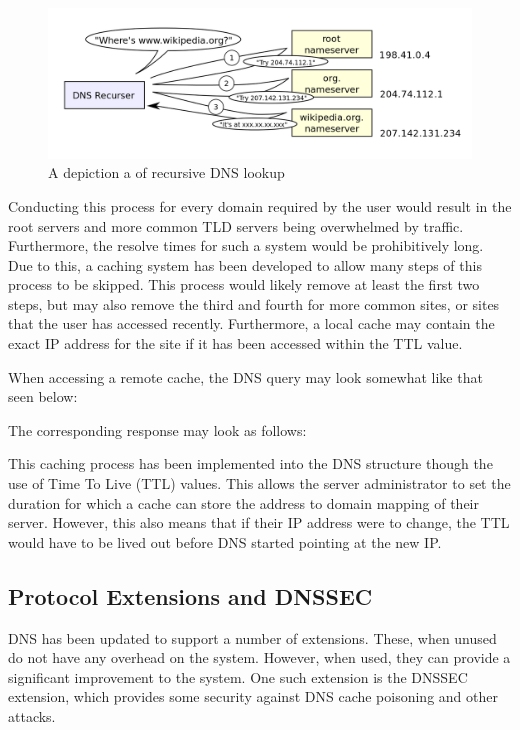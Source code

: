 			\begin{figure}[htb]
				\centering
					\includegraphics[scale=0.27]{./DNSRecursor.png}
					\caption{A depiction a of recursive DNS lookup}
					\label{fig:DNSRecursor}
			\end{figure}

			Conducting this process for every domain required by the user would result in the root servers and more common TLD servers being overwhelmed by traffic.
			Furthermore, the resolve times for such a system would be prohibitively long.
			Due to this, a caching system has been developed to allow many steps of this process to be skipped.
			This process would likely remove at least the first two steps, but may also remove the third and fourth for more common sites, or sites that the user has accessed recently.
			Furthermore, a local cache may contain the exact IP address for the site if it has been accessed within the TTL value.

			When accessing a remote cache, the DNS query may look somewhat like that seen below:
				
			The corresponding response may look as follows:
				

			This caching process has been implemented into the DNS structure though the use of Time To Live (TTL) values.
			This allows the server administrator to set the duration for which a cache can store the address to domain mapping of their server.
			However, this also means that if their IP address were to change, the TTL would have to be lived out before DNS started pointing at the new IP.
		\subsection{Protocol Extensions and DNSSEC}
			DNS has been updated to support a number of extensions.
			These, when unused do not have any overhead on the system.
			However, when used, they can provide a significant improvement to the system.
			One such extension is the DNSSEC extension, which provides some security against DNS cache poisoning and other attacks.

